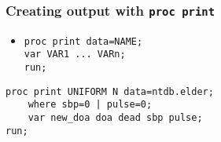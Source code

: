 \documentclass[11pt,pdftex,dvipsnames,usenames,helvetica]{beamer}
\begin{document}
\begin{frame}[fragile]
\frametitle{Creating output with {\tt proc print}}
\begin{itemize}
\item {\tt proc print data=NAME;\\ var VAR1 ...\ VARn;\\ run;}
\end{itemize}
\begin{verbatim}
proc print UNIFORM N data=ntdb.elder;
    where sbp=0 | pulse=0;
    var new_doa doa dead sbp pulse;
run;
\end{verbatim}
\end{frame}
\end{document}
